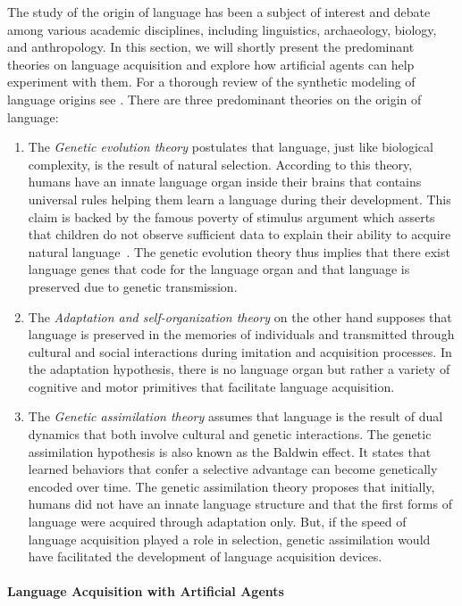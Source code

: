 The study of the origin of language has been a subject of interest and debate among various academic disciplines, including linguistics, archaeology, biology, and anthropology. In this section, we will shortly present the predominant theories on language acquisition and explore how artificial agents can help experiment with them. For a thorough review of the synthetic modeling of language origins see \citet{steels1997evolution}. There are three predominant theories on the origin of language:
\begin{enumerate}[noitemsep]
\item The \textit{Genetic evolution theory} postulates that language, just like biological complexity,  is the result of natural selection. According to this theory, humans have an innate language organ inside their brains that contains universal rules helping them learn a language during their development. This claim is backed by the famous poverty of stimulus argument which asserts that children do not observe sufficient data to explain their ability to acquire natural language~\citep{chomsky1975reflections}. The genetic evolution theory thus implies that there exist language genes that code for the language organ and that language is preserved due to genetic transmission. 
\item The \textit{Adaptation and self-organization theory} on the other hand supposes that language is preserved in the memories of individuals and transmitted through cultural and social interactions during imitation and acquisition processes. In the adaptation hypothesis, there is no language organ but rather a variety of cognitive and motor primitives that facilitate language acquisition. 
\item The \textit{Genetic assimilation theory} assumes that language is the result of dual dynamics that both involve cultural and genetic interactions. The genetic assimilation hypothesis is also known as the Baldwin effect. It states that learned behaviors that confer a selective advantage can become genetically encoded over time.  The genetic assimilation theory proposes that initially, humans did not have an innate language structure and that the first forms of language were acquired through adaptation only. But, if the speed of language acquisition played a role in selection, genetic assimilation would have facilitated the development of language acquisition devices.
\end{enumerate}

\paragraph{Language Acquisition with Artificial Agents}

